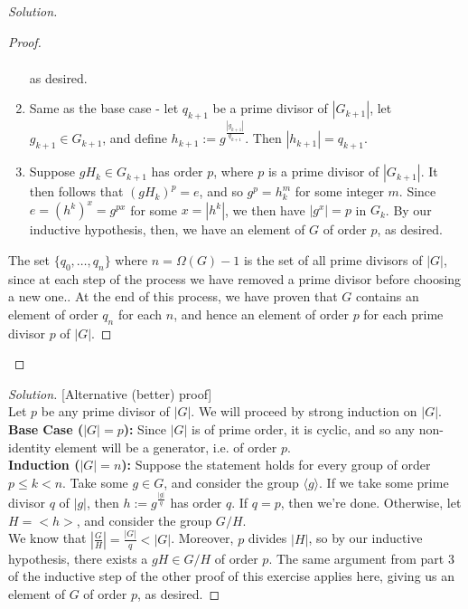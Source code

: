 \documentclass[12pt]{article}
\newenvironment{solution}
  {\renewcommand\qedsymbol{$\blacksquare$}\begin{proof}[Solution]}
{\end{proof}}
\newenvironment{sproof}{
  \renewcommand\qedsymbol{$\square$}
  \begin{proof}
  }{
  \end{proof}
}
\theoremstyle{remark}
\begin{document}
\begin{solution}
\begin{sproof}
\begin{enumerate}
\begin{align*}
        \end{align*}
        as desired.
      \item Same as the base case - let $q_{k+1}$ be a prime divisor of $|G_{k+1}|$, 
        let $g_{k+1}\in G_{k+1}$, and define $h_{k+1}:=g^{\frac{|g_{k+1}|}{q_{k+1}}}$.
        Then $|h_{k+1}|=q_{k+1}$.
      \item Suppose $gH_k\in G_{k+1}$ has order $p$, where $p$ is a prime divisor of $|G_{k+1}|$.
        It then follows that $(gH_k)^p = e$, and so $g^p=h_k^m$ for some integer $m$.
        Since $e=(h^k)^x = g^{px}$ for some $x=|h^k|$, we then have $|g^x|=p$ in $G_k$.
        By our inductive hypothesis, then, we have an element of $G$ of order $p$, as desired.
    \end{enumerate}
    The set $\{q_0, \dots, q_n\}$ where $n=\Omega(G)-1$ is the set of all prime divisors of $|G|$,
    since at each step of the process we have removed a prime divisor before choosing a new one..
    At the end of this process, we have proven that $G$ contains an element of order $q_n$ for each $n$,
    and hence an element of order $p$ for each prime divisor $p$ of $|G|$.
  \end{sproof}
\end{solution}
\begin{solution}[Alternative (better) proof]\\
  Let $p$ be any prime divisor of $|G|$.
  We will proceed by strong induction on $|G|$.\\
  \textbf{Base Case ($|G|=p$):} Since $|G|$ is of prime order, it is cyclic, and so any non-identity
  element will be a generator, i.e. of order $p$.\\
  \textbf{Induction ($|G|=n$):} Suppose the statement holds for every group of order $p\leq k<n$.
  Take some $g\in G$, and consider the group $\langle g\rangle$.
  If we take some prime divisor $q$ of $|g|$, then $h:=g^{\frac{|g|}{q}}$ has order $q$.
  If $q=p$, then we're done.
  Otherwise, let $H=<h>$, and consider the group $G/H$.\\
  We know that $\left|\frac{G}{H}\right| = \frac{|G|}{q} < |G|$.
  Moreover, $p$ divides $|H|$, so by our inductive hypothesis, there exists a $gH\in G/H$ of order $p$.
  The same argument from part 3 of the inductive step of the other proof of this exercise applies here,
  giving us an element of $G$ of order $p$, as desired.
\end{solution}
\end{document}

